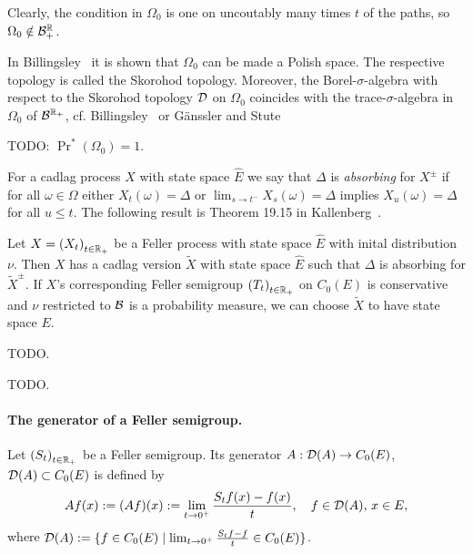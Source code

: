 \documentclass[../Master.tex]{subfiles}
\begin{document}
Clearly, the condition in \(\Omega_0\) is one on uncoutably many times \(t\) of the paths, so \(\Omega_0 \notin \mathcal{B}^{\mathbb{R}}_+\).

In Billingsley~\cite[Section 16]{billingsley_convergence_1968} it is shown that \(\Omega_0\) can be made a Polish space. The respective topology is called the Skorohod topology. Moreover, the Borel-\(\sigma{}\)-algebra with respect to the Skorohod topology \(\mathcal{D}\) on \(\Omega_0\) coincides with the trace-\(\sigma{}\)-algebra in \(\Omega_0\) of \(\mathcal{B}^{\mathbb{R}_+}\), cf. Billingsley~\cite[Theorem 16.6. (iii)]{billingsley_convergence_1968} or Gänssler and Stute~\cite[Section 7.2.10]{ganssler_wahrscheinlichkeitstheorie_1977}

TODO: \(\Pr^*(\Omega_0) = 1\).

For a cadlag process \(X\) with state space \(\hat{E}\) we say that \(\Delta{}\) is \emph{absorbing} for \(X^\pm{}\) if for all \(\omega \in \Omega{}\) either \(X_t(\omega) = \Delta{}\) or \(\lim_{s \to t^-} X_s(\omega) = \Delta{}\) implies \(X_u(\omega) = \Delta{}\) for all \(u \le t\). The following result is Theorem 19.15 in Kallenberg~\cite{kallenberg_foundations_2002}.

\begin{theorem}[Regularization]
  Let \(X = {(X_t)}_{t \in \mathbb{R}_+}\) be a Feller process with state space \(\hat{E}\) with inital distribution \(\nu{}\). Then \(X\) has a cadlag version \(\tilde{X}\) with state space \(\hat{E}\) such that \(\Delta{}\) is absorbing for \(\tilde{X}^\pm{}\). If \(X\)'s corresponding Feller semigroup \({(T_t)}_{t \in \mathbb{R}_+}\) on \(C_0(E)\) is conservative and \(\nu{}\) restricted to \(\mathcal{B}\) is a probability measure, we can choose \(\tilde{X}\) to have state space \(E\).
\end{theorem}

TODO.

\begin{nrremark}\label{rem:canonical_Feller_process}
  TODO.
\end{nrremark}

\paragraph{The generator of a Feller semigroup.}
Let \({(S_t)}_{t \in \mathbb{R}_+}\) be a Feller semigroup. Its generator \(A: \mathcal{D}(A) \to C_0(E)\), \(\mathcal{D}(A) \subset C_0(E)\) is defined by
\begin{equation*}
  A f(x) := (Af)(x) := \lim_{t \to 0^+} \frac{S_t f(x) - f(x)}{t}, \quad f \in \mathcal{D}(A), \, x \in E,
\end{equation*}
where \(\mathcal{D}(A) := \{ f \in C_0(E) \mid \lim_{t \to 0^+} \frac{S_t f - f}{t} \in C_0(E)\} \).
\end{document}
